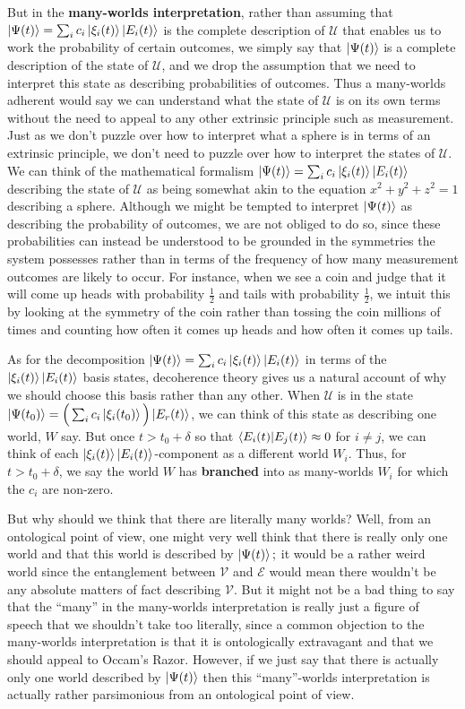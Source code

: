 \documentclass[letter, 12pt]{turabian-thesis}
\theoremstyle{hypothesis}
\begin{document}
But in the \textbf{many-worlds interpretation}, rather than assuming that $\ket{\Psi(t)}=\sum_i c_i \ket{\xi_i(t)}\ket{E_i(t)}$ is the complete description of $\mathcal{U}$ that enables us to work the probability of certain outcomes, we simply say that $\ket{\Psi(t)}$ is a complete description of the state of $\mathcal{U}$, and we drop the assumption that we need to interpret this state as describing probabilities of outcomes. Thus a many-worlds adherent would say we can understand what the state of $\mathcal{U}$ is on its own terms without the need to appeal to any other extrinsic principle such as measurement. Just as we don't puzzle over how to interpret what a sphere is in terms of an extrinsic principle, we don't need to puzzle over how to interpret the states of $\mathcal{U}$. We can think of the mathematical formalism $\ket{\Psi(t)}=\sum_i c_i \ket{\xi_i(t)}\ket{E_i(t)}$ describing the state of $\mathcal{U}$ as being somewhat akin to the equation $x^2+y^2+z^2=1$ describing a sphere. Although we might be tempted to interpret $\ket{\Psi(t)}$ as describing the probability of outcomes, we are not obliged to do so,  since these probabilities can instead be understood to be grounded in the symmetries the system possesses rather than in terms of the frequency of how many measurement outcomes are likely to occur. For instance, when we see a coin and judge that it will come up heads with probability $\frac{1}{2}$ and tails with probability $\frac{1}{2}$, we intuit this by looking at the symmetry of the coin rather than tossing the coin millions of times and counting how often it comes up heads and how often it comes up tails.
 
As for the decomposition $\ket{\Psi(t)}=\sum_i c_i \ket{\xi_i(t)}\ket{E_i(t)}$  in terms of the $\ket{\xi_i(t)}\ket{E_i(t)}$ basis states, decoherence theory gives us a natural account of why we should choose this basis rather than any other. When $\mathcal{U}$ is in the state $\ket{\Psi(t_0)}=\Big(\sum_i c_i \ket{\xi_i(t_0)}\Big)\ket{E_r(t)}$, we can think of this state as describing one world, $W$ say. But once $t>t_0+\delta$ so that $\ip{E_i(t)}{E_j(t)}\approx 0$ for $i\neq j$, we can think of each $\ket{\xi_i(t)}\ket{E_i(t)}$-component as a different world $W_i$. Thus, for $t>t_0+\delta$, we say the world $W$ has \textbf{branched} into as many-worlds $W_i$ for which the $c_i$ are non-zero. 

But why should we think that there are literally many worlds? Well, from an ontological point of view, one might very well think that there is really only one world and that this world is described by $\ket{\Psi(t)};$ it would be a rather weird world since the entanglement between $\mathcal{V}$ and $\mathcal{E}$ would mean there wouldn't be any absolute matters of fact describing $\mathcal{V}$. But it might not be a bad thing to say that the ``many'' in the many-worlds interpretation is really just a figure of speech that we shouldn't take too literally, since a common objection to the many-worlds interpretation is that it is ontologically extravagant and that we should appeal to Occam's Razor. However, if we just say that there is actually only one world described by $\ket{\Psi(t)}$ then this ``many''-worlds interpretation is actually rather parsimonious from an ontological point of view. 
\end{document}
